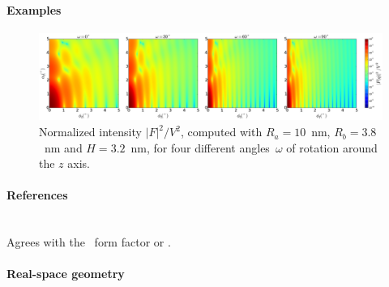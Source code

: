 \paragraph{Examples}\strut

\begin{figure}[H]
\begin{center}
\includegraphics[width=\textwidth]{fig/ff2/ff_HemiEllipsoid.pdf}
\end{center}
\caption{Normalized intensity $|F|^2/V^2$,
computed with $R_a=10$~nm, $R_b=3.8$~nm and $H=3.2$~nm,
for four different angles~$\omega$ of rotation around the $z$ axis.}
\end{figure}

\paragraph{References}\strut\\
Agrees with the \IsGISAXS\ form factor
\cite[Eq.~2.42, with wrong sign in the $z$-dependent phase factor]{Laz08}
or  \cite[Eq.~229]{ReLL09}.


 \label{SFullSpheroid}

\paragraph{Real-space geometry}\strut\\

